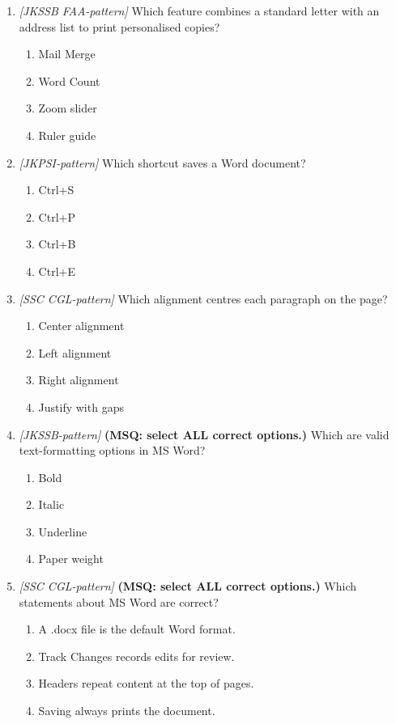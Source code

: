 \begin{enumerate}[label=\textbf{Q\arabic*.}, leftmargin=*]
\item \textit{[JKSSB FAA-pattern]} Which feature combines a standard letter with an address list to print personalised copies?
  \begin{enumerate}[label=\Alph*.]
    \item Mail Merge
    \item Word Count
    \item Zoom slider
    \item Ruler guide
  \end{enumerate}
\item \textit{[JKPSI-pattern]} Which shortcut saves a Word document?
  \begin{enumerate}[label=\Alph*.]
    \item Ctrl+S
    \item Ctrl+P
    \item Ctrl+B
    \item Ctrl+E
  \end{enumerate}
\item \textit{[SSC CGL-pattern]} Which alignment centres each paragraph on the page?
  \begin{enumerate}[label=\Alph*.]
    \item Center alignment
    \item Left alignment
    \item Right alignment
    \item Justify with gaps
  \end{enumerate}
\item \textit{[JKSSB-pattern]} \textbf{(MSQ: select ALL correct options.)} Which are valid text-formatting options in MS Word?
  \begin{enumerate}[label=\Alph*.]
    \item Bold
    \item Italic
    \item Underline
    \item Paper weight
  \end{enumerate}
\item \textit{[SSC CGL-pattern]} \textbf{(MSQ: select ALL correct options.)} Which statements about MS Word are correct?
  \begin{enumerate}[label=\Alph*.]
    \item A .docx file is the default Word format.
    \item Track Changes records edits for review.
    \item Headers repeat content at the top of pages.
    \item Saving always prints the document.

\end{enumerate}
\end{enumerate}

